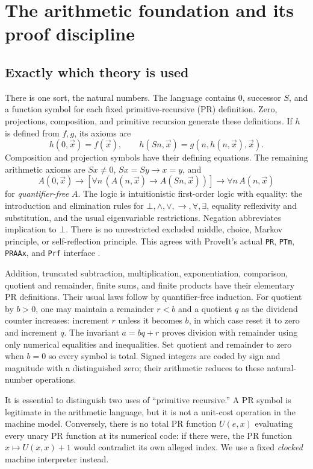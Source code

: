 \section{The arithmetic foundation and its proof discipline}
\label{sec:foundations}

\subsection{Exactly which theory is used}
There is one sort, the natural numbers. The language contains $0$, successor $S$, and a function symbol for each fixed primitive-recursive (PR) definition. Zero, projections, composition, and primitive recursion generate these definitions. If $h$ is defined from $f,g$, its axioms are
\[
 h(0,\vec x)=f(\vec x),\qquad
 h(Sn,\vec x)=g(n,h(n,\vec x),\vec x).
\]
Composition and projection symbols have their defining equations. The remaining arithmetic axioms are $Sx\ne0$, $Sx=Sy\to x=y$, and
\[
 A(0,\vec x)\to
 [\forall n\,(A(n,\vec x)\to A(Sn,\vec x))]\to
 \forall n\,A(n,\vec x)
\]
for \emph{quantifier-free} $A$. The logic is intuitionistic first-order logic with equality: the introduction and elimination rules for $\bot,\land,\lor,\to,\forall,\exists$, equality reflexivity and substitution, and the usual eigenvariable restrictions. Negation abbreviates implication to $\bot$. There is no unrestricted excluded middle, choice, Markov principle, or self-reflection principle. This agrees with ProveIt's actual \texttt{PR}, \texttt{PTm}, \texttt{PRAAx}, and \texttt{Prf} interface \cite{ProveItPR}.

Addition, truncated subtraction, multiplication, exponentiation, comparison, quotient and remainder, finite sums, and finite products have their elementary PR definitions. Their usual laws follow by quantifier-free induction. For quotient by $b>0$, one may maintain a remainder $r<b$ and a quotient $q$ as the dividend counter increases: increment $r$ unless it becomes $b$, in which case reset it to zero and increment $q$. The invariant $a=bq+r$ proves division with remainder using only numerical equalities and inequalities. Set quotient and remainder to zero when $b=0$ so every symbol is total. Signed integers are coded by sign and magnitude with a distinguished zero; their arithmetic reduces to these natural-number operations.

It is essential to distinguish two uses of ``primitive recursive.'' A PR symbol is legitimate in the arithmetic language, but it is not a unit-cost operation in the machine model. Conversely, there is no total PR function $U(e,x)$ evaluating every unary PR function at its numerical code: if there were, the PR function $x\mapsto U(x,x)+1$ would contradict its own alleged index. We use a fixed \emph{clocked} machine interpreter instead.

